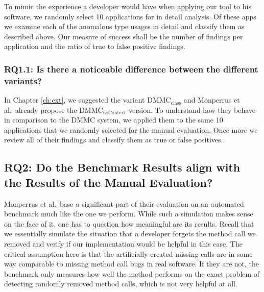 To mimic the experience a developer would have when applying our tool to his software, we randomly select 10 applications for in detail analysis.
Of these apps we examine each of the anomalous type usages in detail and classify them as described above.
Our measure of success shall be the number of findings per application and the ratio of true to false positive findings.


\subsubsection{RQ1.1: Is there a noticeable difference between the different variants?}

In Chapter \ref{ch:ext}, we suggested the variant $\text{DMMC}_\text{class}$ and Monperrus et al.\ already propose the $\text{DMMC}_\text{noContext}$ version.
To understand how they behave in comparison to the $\text{DMMC}$ system, we applied them to the same 10 applications that we randomly selected for the manual evaluation.
Once more we review all of their findings and classify them as true or false positives.



\subsection{RQ2: Do the Benchmark Results align with the Results of the Manual Evaluation?}

Monperrus et al.\ base a significant part of their evaluation on an automated benchmark much like the one we perform.
While such a simulation makes sense on the face of it, one has to question how meaningful are its results.
Recall that we essentially simulate the situation that a developer forgets the method call we removed and verify if our implementation would be helpful in this case.
The critical assumption here is that the artificially created missing calls are in some way comparable to missing method call bugs in real software.
If they are not, the benchmark only measures how well the method performs on the exact problem of detecting randomly removed method calls, which is not very helpful at all.

